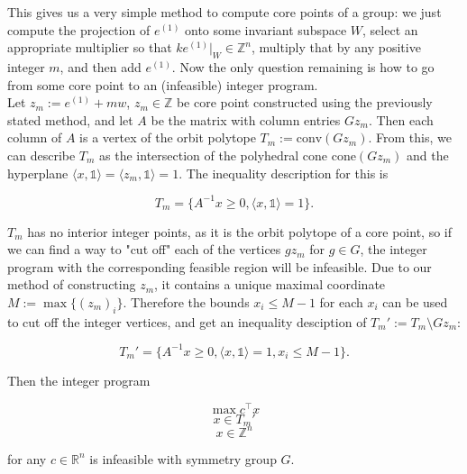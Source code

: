 \documentclass[11pt]{article} %
\theoremstyle{definition}
\theoremstyle{remark}
\newcommand{\ZZ}{\mathbb{Z}}
\newcommand{\RR}{\mathbb{R}}
\begin{document}
This gives us a very simple method to compute core points of a group: we just compute the projection of $e^{(1)}$ onto some invariant subspace $W$, select an appropriate multiplier so that $ke^{(1)}|_W \in \ZZ^n$, multiply that by any positive integer $m$, and then add $e^{(1)}$. Now the only question remaining is how to go from some core point to an (infeasible) integer program.\\

Let $z_m := e^{(1)} + mw$, $z_m \in \ZZ$ be core point constructed using the previously stated method, and let $A$ be the matrix with column entries $Gz_m$. Then each column of $A$ is a vertex of the orbit polytope $T_m := \textrm{conv}(Gz_m)$. From this, we can describe $T_m$ as the intersection of the polyhedral cone $\textrm{cone}(Gz_m)$ and the hyperplane $\langle x,\mathds{1} \rangle = \langle z_m, \mathds{1} \rangle = 1$. The inequality description for this is

\[ T_m = \lbrace A^{-1}x \geq 0, \langle x,\mathds{1} \rangle = 1 \rbrace .\]

$T_m$ has no interior integer points, as it is the orbit polytope of a core point, so if we can find a way to "cut off" each of the vertices $gz_m$ for $g \in G$, the integer program with the corresponding feasible region will be infeasible. Due to our method of constructing $z_m$, it contains a unique maximal coordinate $M := \max \lbrace {(z_m)_i} \rbrace$. Therefore the bounds $x_i \leq M-1$ for each $x_i$ can be used to cut off the integer vertices, and get an inequality desciption of $T_m' := T_m \setminus Gz_m$:

\[ T_m' = \lbrace A^{-1}x \geq 0, \langle x,\mathds{1} \rangle = 1, x_i \leq M-1 \rbrace .\]

Then the integer program 

\[ \max c^\intercal x \] \[ x \in T_m' \] \[ x \in \ZZ^n \]

for any $c \in \RR^n$ is infeasible with symmetry group $G$.
\end{document}
